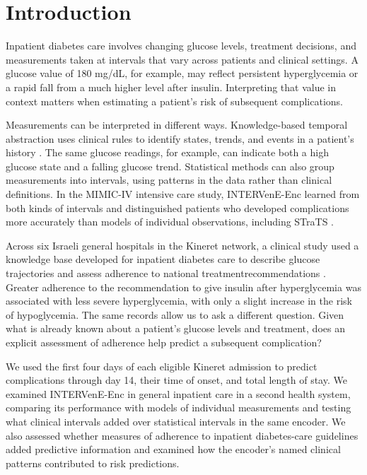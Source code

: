 \section{Introduction}
\label{sec:introduction}
Inpatient diabetes care involves changing glucose levels, treatment decisions, and measurements taken at intervals that vary across patients and clinical settings. A glucose value of 180 mg/dL, for example, may reflect persistent hyperglycemia or a rapid fall from a much higher level after insulin. Interpreting that value in context matters when estimating a patient's risk of subsequent complications.

Measurements can be interpreted in different ways. Knowledge-based temporal abstraction uses clinical rules to identify states, trends, and events in a patient's history \citep{shahar1997framework}. The same glucose readings, for example, can indicate both a high glucose state and a falling glucose trend. Statistical methods can also group measurements into intervals, using patterns in the data rather than clinical definitions. In the MIMIC-IV intensive care study, INTERVenE-Enc learned from both kinds of intervals and distinguished patients who developed complications more accurately than models of individual observations, including STraTS \citep{oded2026intervene,johnson2023mimiciv}.

Across six Israeli general hospitals in the Kineret network, a clinical study used a knowledge base developed for inpatient diabetes care to describe glucose trajectories and assess adherence to national treatmentrecommendations \citep{oded2027kineret-jbi,hochberg2023inpatient}. Greater adherence to the recommendation to give insulin after hyperglycemia was associated with less severe hyperglycemia, with only a slight increase in the risk of hypoglycemia. The same records allow us to ask a different question. Given what is already known about a patient's glucose levels and treatment, does an explicit assessment of adherence help predict a subsequent complication?

We used the first four days of each eligible Kineret admission to predict complications through day 14, their time of onset, and total length of stay. We examined INTERVenE-Enc in general inpatient care in a second health system, comparing its performance with models of individual measurements and testing what clinical intervals added over statistical intervals in the same encoder. We also assessed whether measures of adherence to inpatient diabetes-care guidelines added predictive information and examined how the encoder's named clinical patterns contributed to risk predictions.
